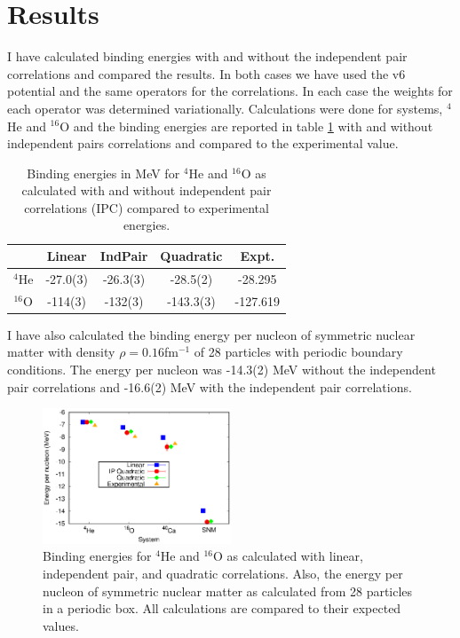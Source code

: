 \section{Results}
I have calculated binding energies with and without the independent pair correlations and compared the results. In both cases we have used the v6 potential and the same operators for the correlations. In each case the weights for each operator was determined variationally. Calculations were done for systems, $^4$He and $^{16}$O and the binding energies are reported in table \ref{tab:indpairresults} with and without independent pairs correlations and compared to the experimental value.

\begin{table}[h!]
   \centering
   \caption{Binding energies in MeV for $^4$He and $^{16}$O as calculated with and without independent pair correlations (IPC) compared to experimental energies.}
   \label{tab:indpairresults}
   \begin{tabular}{ccccc}
      \hline \hline
       & Linear & IndPair & Quadratic & Expt.\\
      \hline
      $^4$He & -27.0(3) & -26.3(3) & -28.5(2) & -28.295\\
      $^{16}$O & -114(3) & -132(3) & -143.3(3) & -127.619\\
      \hline \hline
   \end{tabular}
\end{table}

I have also calculated the binding energy per nucleon of symmetric nuclear matter with density $\rho=0.16$fm$^{-1}$ of 28 particles with periodic boundary conditions. The energy per nucleon was -14.3(2) MeV without the independent pair correlations and -16.6(2) MeV with the independent pair correlations.

\begin{figure}[h!]
   \centering
   \includegraphics[width=0.5\textwidth]{energies.eps}
   \caption{Binding energies for ${}^4$He and ${}^{16}$O as calculated with linear, independent pair, and quadratic correlations. Also, the energy per nucleon of symmetric nuclear matter as calculated from 28 particles in a periodic box. All calculations are compared to their expected values.}
   \label{fig:energies}
\end{figure}
